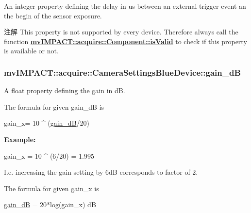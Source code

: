 An integer property defining the delay in us between an external trigger event an the begin of the sensor exposure. 

\begin{DoxyNote}{注解}
This property is not supported by every device. Therefore always call the function {\bfseries \hyperlink{classmv_i_m_p_a_c_t_1_1acquire_1_1_component_ac51e55e7e046101f3c6119d84123abd5}{mv\+I\+M\+P\+A\+C\+T\+::acquire\+::\+Component\+::is\+Valid}} to check if this property is available or not. 
\end{DoxyNote}
\hypertarget{classmv_i_m_p_a_c_t_1_1acquire_1_1_camera_settings_blue_device_a670966b0117c0fbf623d169e9ee69431}{
\subsubsection[{gain\+\_\+d\+B}]{ mv\+I\+M\+P\+A\+C\+T\+::acquire\+::\+Camera\+Settings\+Blue\+Device\+::gain\+\_\+d\+B}}\label{classmv_i_m_p_a_c_t_1_1acquire_1_1_camera_settings_blue_device_a670966b0117c0fbf623d169e9ee69431}


A float property defining the gain in d\+B. 

The formula for given {\ttfamily gain\+\_\+d\+B} is 
\begin{DoxyCode}
gain\_x= 10 ^ (\hyperlink{classmv_i_m_p_a_c_t_1_1acquire_1_1_camera_settings_blue_device_a670966b0117c0fbf623d169e9ee69431}{gain\_dB}/20)
\end{DoxyCode}


{\bfseries Example\+:} 


\begin{DoxyCode}
gain\_x = 10 ^ (6/20) = 1.995
\end{DoxyCode}


I.\+e. increasing the gain setting by 6d\+B corresponds to factor of 2.

The formula for given gain\+\_\+x is 
\begin{DoxyCode}
\hyperlink{classmv_i_m_p_a_c_t_1_1acquire_1_1_camera_settings_blue_device_a670966b0117c0fbf623d169e9ee69431}{gain\_dB} = 20*log(gain\_x) dB
\end{DoxyCode}


